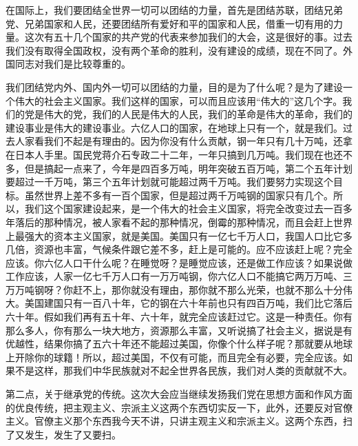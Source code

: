 在国际上，我们要团结全世界一切可以团结的力量，首先是团结苏联，团结兄弟党、兄弟国家和人民，还要团结所有爱好和平的国家和人民，借重一切有用的力量。这次有五十几个国家的共产党的代表来参加我们的大会，这是很好的事。过去我们没有取得全国政权，没有两个革命的胜利，没有建设的成绩，现在不同了。外国同志对我们是比较尊重的。

我们团结党内外、国内外一切可以团结的力量，目的是为了什么呢？是为了建设一个伟大的社会主义国家。我们这样的国家，可以而且应该用“伟大的”这几个字。我们的党是伟大的党，我们的人民是伟大的人民，我们的革命是伟大的革命，我们的建设事业是伟大的建设事业。六亿人口的国家，在地球上只有一个，就是我们。过去人家看我们不起是有理由的。因为你没有什么贡献，钢一年只有几十万吨，还拿在日本人手里。国民党蒋介石专政二十二年，一年只搞到几万吨。我们现在也还不多，但是搞起一点来了，今年是四百多万吨，明年突破五百万吨，第二个五年计划要超过一千万吨，第三个五年计划就可能超过两千万吨。我们要努力实现这个目标。虽然世界上差不多有一百个国家，但是超过两千万吨钢的国家只有几个。所以，我们这个国家建设起来，是一个伟大的社会主义国家，将完全改变过去一百多年落后的那种情况，被人家看不起的那种情况，倒霉的那种情况，而且会赶上世界上最强大的资本主义国家，就是美国。美国只有一亿七千万人口，我国人口比它多几倍，资源也丰富，气候条件跟它差不多，赶上是可能的。应不应该赶上呢？完全应该。你六亿人口干什么呢？在睡觉呀？是睡觉应该，还是做工作应该？如果说做工作应该，人家一亿七千万人口有一万万吨钢，你六亿人口不能搞它两万万吨、三万万吨钢呀？你赶不上，那你就没有理由，那你就不那么光荣，也就不那么十分伟大。美国建国只有一百八十年，它的钢在六十年前也只有四百万吨，我们比它落后六十年。假如我们再有五十年、六十年，就完全应该赶过它。这是一种责任。你有那么多人，你有那么一块大地方，资源那么丰富，又听说搞了社会主义，据说是有优越性，结果你搞了五六十年还不能超过美国，你像个什么样子呢？那就要从地球上开除你的球籍！所以，超过美国，不仅有可能，而且完全有必要，完全应该。如果不是这样，那我们中华民族就对不起全世界各民族，我们对人类的贡献就不大。

第二点，关于继承党的传统。这次大会应当继续发扬我们党在思想方面和作风方面的优良传统，把主观主义、宗派主义这两个东西切实反一下，此外，还要反对官僚主义。官僚主义那个东西我今天不讲，只讲主观主义和宗派主义。这两个东西，扫了又发生，发生了又要扫。

